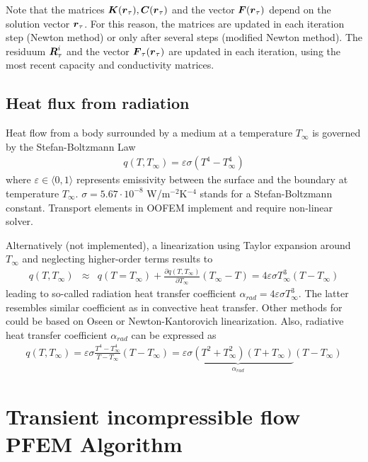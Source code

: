 Note that the matrices $\mbox{\boldmath$K$}(\mbox{\boldmath$r$}_\tau), \mbox{\boldmath$C$}(\mbox{\boldmath$r$}_\tau)$ and the vector $\mbox{\boldmath$F$}(\mbox{\boldmath$r$}_\tau)$ depend on the solution vector $\mbox{\boldmath$r$}_\tau$. For this reason, the matrices are updated in each iteration step (Newton method) or only after several steps (modified Newton method). The residuum $\mbox{\boldmath$R$}_\tau^{i}$ and the vector $\mbox{\boldmath$F$}_\tau(\mbox{\boldmath$r$}_\tau)$ are updated in each iteration, using the most recent capacity and conductivity matrices.

\subsection{Heat flux from radiation}

Heat flow from a body surrounded by a medium at a temperature $T_\infty$ is governed by the Stefan-Boltzmann Law
\begin{eqnarray}
q(T, T_\infty) = \varepsilon \sigma (T^4 - T_\infty^4)\label{eq:StefanBoltzmann}
\end{eqnarray}
where $\varepsilon\in\langle 0, 1 \rangle$ represents emissivity between the surface and the boundary at temperature $T_\infty$. $\sigma=5.67\cdot 10^{-8}$ W/m$^{-2}$K$^{-4}$ stands for a Stefan-Boltzmann constant. Transport elements in OOFEM implement  and require non-linear solver.

Alternatively (not implemented), a linearization using Taylor expansion around $T_\infty$ and neglecting higher-order terms results to
\begin{eqnarray}
q(T, T_\infty) &\approx& q(T=T_\infty) + \frac{\partial q(T,T_\infty)}{\partial T_\infty} (T_\infty-T) = 4\varepsilon \sigma T_\infty^3 (T-T_\infty)
\end{eqnarray}
leading to so-called radiation heat transfer coefficient $\alpha_{rad}=4\varepsilon \sigma T_\infty^3$. The latter resembles similar coefficient as in convective heat transfer. Other methods for  could be based on Oseen or Newton-Kantorovich linearization. Also, radiative heat transfer coefficient $\alpha_{rad}$ can be expressed as \cite[pp.28]{Baehr:06}
\begin{eqnarray}
q(T, T_\infty) = \varepsilon \sigma \frac{T^4 - T_\infty^4}{T-T_\infty}(T-T_\infty) = \underbrace{\varepsilon \sigma (T^2+T_\infty^2)(T+T_\infty)}_{\alpha_{rad}}(T-T_\infty)
\end{eqnarray}



\section{Transient incompressible flow\\PFEM Algorithm}
